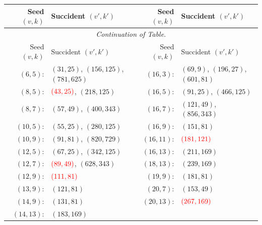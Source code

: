 \documentclass{beamer}
\newcommand{\RR}[1]{\textcolor{red}{#1}}
\begin{document}
\begin{frame}

  \begin{scriptsize}
    \begin{longtable}[c]{rl|rl}

      Seed $(v,k)$ & Succident $(v',k')$ & Seed $(v,k)$ & Succident $(v',k')$ \\
      \hline
      \endfirsthead

      \multicolumn{4}{c}{\it Continuation of Table.}\\
      Seed $(v,k)$ & Succident $(v',k')$ & Seed $(v,k)$ & Succident $(v',k')$ \\
      \hline
      \endhead

      \endfoot

      $(6,5)$: & $(31,25)$, $(156,125)$, $(781,625)$ & $(16,3)$: & $(69,9)$, $(196,27)$, $(601,81)$ \\
      $(8,5)$: & $\RR{(43,25)}$, $(218,125)$ & $(16,5)$: & $(91,25)$, $(466,125)$ \\
      $(8,7)$: & $(57,49)$, $(400,343)$ & $(16,7)$: & $(121,49)$, $(856,343)$ \\
      $(10,5)$: & $(55,25)$, $(280,125)$ & $(16,9)$: & $(151,81)$ \\
      $(10,9)$: & $(91,81)$, $(820,729)$ & $(16,11)$: & $\RR{(181,121)}$ \\
      $(12,5)$: & $(67,25)$, $(342,125)$ & $(16,13)$: & $(211,169)$ \\
      $(12,7)$: & $\RR{(89,49)}$, $(628,343)$ & $(18,13)$: & $(239,169)$ \\
      $(12,9)$: & $\RR{(111,81)}$ & $(19,9)$: & $(181,81)$ \\
      $(13,9)$: & $(121,81)$ & $(20,7)$: & $(153,49)$ \\
      $(14,9)$: & $(131,81)$ & $(20,13)$: & $\RR{(267,169)}$ \\
      $(14,13)$: & $(183,169)$ & & \\

    \end{longtable}
  \end{scriptsize}
  
\end{frame}
\end{document}
